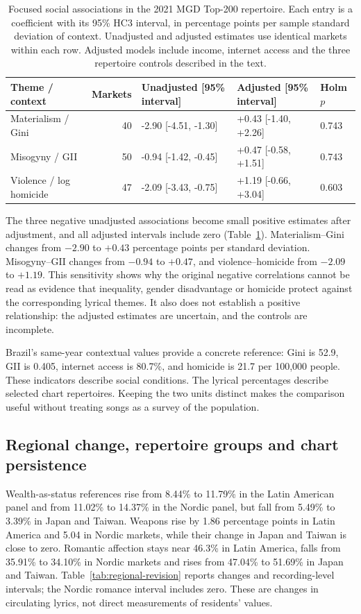 \documentclass[10pt,a4paper,twocolumn]{article}
\begin{document}
\begin{table}[t]
\caption{Focused social associations in the 2021 MGD Top-200 repertoire. Each entry is a coefficient with its 95\% HC3 interval, in percentage points per sample standard deviation of context. Unadjusted and adjusted estimates use identical markets within each row. Adjusted models include income, internet access and the three repertoire controls described in the text.}
\label{tab:context}
\centering\small
\begin{tabularx}{\textwidth}{@{}Xrlll@{}}
\toprule Theme / context & Markets & Unadjusted [95\% interval] & Adjusted [95\% interval] & Holm $p$ \\
\midrule
Materialism / Gini & 40 & -2.90 [-4.51, -1.30] & +0.43 [-1.40, +2.26] & 0.743 \\
Misogyny / GII & 50 & -0.94 [-1.42, -0.45] & +0.47 [-0.58, +1.51] & 0.743 \\
Violence / log homicide & 47 & -2.09 [-3.43, -0.75] & +1.19 [-0.66, +3.04] & 0.603 \\
\bottomrule
\end{tabularx}
\end{table}

The three negative unadjusted associations become small positive estimates after adjustment, and all adjusted intervals include zero (Table~\ref{tab:context}). Materialism--Gini changes from $-2.90$ to $+0.43$ percentage points per standard deviation. Misogyny--GII changes from $-0.94$ to $+0.47$, and violence--homicide from $-2.09$ to $+1.19$. This sensitivity shows why the original negative correlations cannot be read as evidence that inequality, gender disadvantage or homicide protect against the corresponding lyrical themes. It also does not establish a positive relationship: the adjusted estimates are uncertain, and the controls are incomplete.

Brazil's same-year contextual values provide a concrete reference: Gini is 52.9, GII is 0.405, internet access is 80.7\%, and homicide is 21.7 per 100,000 people. These indicators describe social conditions. The lyrical percentages describe selected chart repertoires. Keeping the two units distinct makes the comparison useful without treating songs as a survey of the population.


\subsection{Regional change, repertoire groups and chart persistence}
Wealth-as-status references rise from 8.44\% to 11.79\% in the Latin American panel and from 11.02\% to 14.37\% in the Nordic panel, but fall from 5.49\% to 3.39\% in Japan and Taiwan. Weapons rise by 1.86 percentage points in Latin America and 5.04 in Nordic markets, while their change in Japan and Taiwan is close to zero. Romantic affection stays near 46.3\% in Latin America, falls from 35.91\% to 34.10\% in Nordic markets and rises from 47.04\% to 51.69\% in Japan and Taiwan. Table~\ref{tab:regional-revision} reports changes and recording-level intervals; the Nordic romance interval includes zero. These are changes in circulating lyrics, not direct measurements of residents' values.
\end{document}
